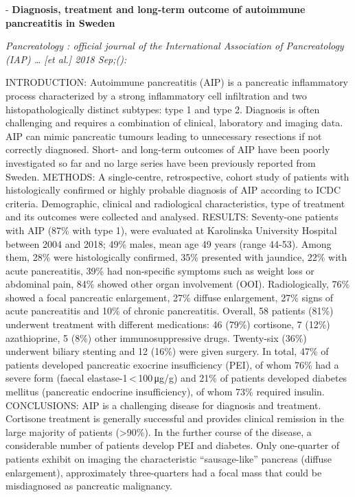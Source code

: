 \documentclass[]{article}
\begin{document}
 - \textbf{Diagnosis, treatment and long-term outcome of autoimmune
pancreatitis in Sweden}

\emph{Pancreatology : official journal of the International Association
of Pancreatology (IAP) \ldots{} {[}et al.{]} 2018 Sep;():}

INTRODUCTION: Autoimmune pancreatitis (AIP) is a pancreatic inflammatory
process characterized by a strong inflammatory cell infiltration and two
histopathologically distinct subtypes: type 1 and type 2. Diagnosis is
often challenging and requires a combination of clinical, laboratory and
imaging data. AIP can mimic pancreatic tumours leading to unnecessary
resections if not correctly diagnosed. Short- and long-term outcomes of
AIP have been poorly investigated so far and no large series have been
previously reported from Sweden. METHODS: A single-centre,
retrospective, cohort study of patients with histologically confirmed or
highly probable diagnosis of AIP according to ICDC criteria.
Demographic, clinical and radiological characteristics, type of
treatment and its outcomes were collected and analysed. RESULTS:
Seventy-one patients with AIP (87\% with type 1), were evaluated at
Karolinska University Hospital between 2004 and 2018; 49\% males, mean
age 49 years (range 44-53). Among them, 28\% were histologically
confirmed, 35\% presented with jaundice, 22\% with acute pancreatitis,
39\% had non-specific symptoms such as weight loss or abdominal pain,
84\% showed other organ involvement (OOI). Radiologically, 76\% showed a
focal pancreatic enlargement, 27\% diffuse enlargement, 27\% signs of
acute pancreatitis and 10\% of chronic pancreatitis. Overall, 58
patients (81\%) underwent treatment with different medications: 46
(79\%) cortisone, 7 (12\%) azathioprine, 5 (8\%) other immunosuppressive
drugs. Twenty-six (36\%) underwent biliary stenting and 12 (16\%) were
given surgery. In total, 47\% of patients developed pancreatic exocrine
insufficiency (PEI), of whom 76\% had a severe form (faecal
elastase-1\,\textless{}\,100\,μg/g) and 21\% of patients developed
diabetes mellitus (pancreatic endocrine insufficiency), of whom 73\%
required insulin. CONCLUSIONS: AIP is a challenging disease for
diagnosis and treatment. Cortisone treatment is generally successful and
provides clinical remission in the large majority of patients
(\textgreater{}90\%). In the further course of the disease, a
considerable number of patients develop PEI and diabetes. Only
one-quarter of patients exhibit on imaging the characteristic
``sausage-like'' pancreas (diffuse enlargement), approximately
three-quarters had a focal mass that could be misdiagnosed as pancreatic
malignancy.
\end{document}
